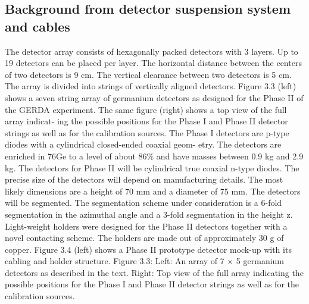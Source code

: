 \subsection{Background from detector suspension system and cables}
\label{sec:gerda:cable}
The detector array consists of hexagonally packed detectors with 3 layers. Up to 19 detectors can be placed per layer. The horizontal distance between the centers of two detectors is 9 cm. The vertical clearance between two detectors  is 5 cm. The array is divided into strings of vertically aligned detectors. Figure 3.3 (left) shows a seven string array of germanium detectors as designed for the Phase II of the GERDA experiment. The same figure (right) shows a top view of the full array indicat- ing the possible positions for the Phase I and Phase II detector strings as well as for the calibration sources.  The Phase I detectors are p-type diodes with a cylindrical closed-ended coaxial geom- etry. The detectors are enriched in 76Ge to a level of about 86\% and have masses between 0.9 kg and 2.9 kg.  The detectors for Phase II will be cylindrical true coaxial n-type diodes. The precise size of the detectors will depend on manufacturing details. The most likely dimensions are a height of 70 mm and a diameter of 75 mm. The detectors will be segmented. The segmentation scheme under consideration is a 6-fold segmentation in the azimuthal angle and a 3-fold segmentation in the height z. Light-weight holders were designed for the Phase II detectors together with a novel contacting scheme. The holders are made out of approximately 30 g of copper. Figure 3.4 (left) shows a Phase II prototype detector mock-up with its cabling and holder structure.  Figure 3.3: Left: An array of 7 × 5 germanium detectors as described in the text. Right: Top view of the full array indicating the possible positions for the Phase I and Phase II detector strings as well as for the calibration sources.

